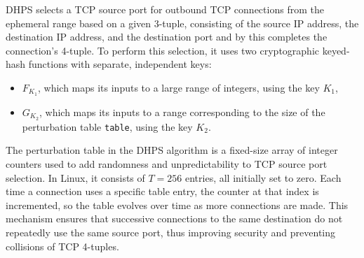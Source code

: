 \documentclass[twocolumn]{report}
\begin{document}
{	DHPS selects a TCP \alert{source port} for outbound TCP connections from the ephemeral range based on a given \alert{3-tuple}, consisting of the \alert{source IP} address, the \alert{destination IP} address, and the \alert{destination port} and by this completes the connection’s \alert{4-tuple}. To perform this selection, it uses two \alert{cryptographic keyed-hash functions} with separate, independent keys:
	\begin{itemize}
		\item \( F_{K_1} \), which maps its inputs to a large range of integers, using the key \( K_1 \),
		\item \( G_{K_2} \), which maps its inputs to a range corresponding to the size of the \alert{perturbation table} \texttt{table}, using the key \( K_2 \).
	\end{itemize}
	The \alert{perturbation table} in the DHPS algorithm is a fixed-size array of integer counters used to add randomness and unpredictability to TCP source port selection. In Linux, it consists of $T = 256$ entries, all initially set to zero. Each time a connection uses a specific table entry, the counter at that index is incremented, so the table evolves over time as more connections are made. This mechanism ensures that successive connections to the same destination do not repeatedly use the same source port, thus improving security and preventing collisions of TCP 4-tuples.
}
\end{document}
